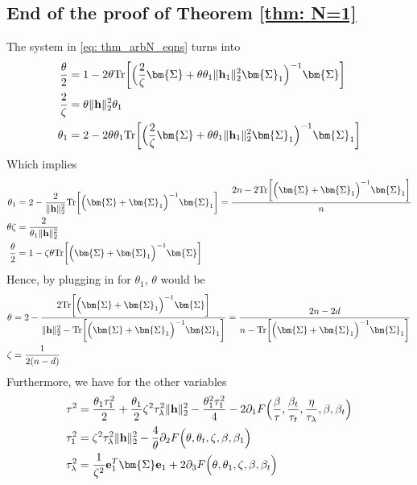 \documentclass[final]{l4dc2026}
\newcommand{\bSigma}{\bm{\Sigma}}
\newcommand{\be}{\mathbf{e}}
\newcommand{\bh}{\mathbf{h}}
\newcommand{\tr}{\text{Tr}}
\begin{document}
\subsection{End of the proof of Theorem \ref{thm: N=1}}
The system in \eqref{eq: thm_arbN_eqns} turns into
\begin{align*}
    \frac{\theta}{2}  &= 1 -  2\theta \tr \biggl[\Bigl(\frac{2}{\zeta}\bSigma+\theta \theta_1 \|\bh_1\|_2^2 \bSigma_1 \Bigr)^{-1} \bSigma \biggr] \\
    \frac{2}{\zeta} &= \theta \|\bh\|_2^2  \theta_1 \\
    \theta_1 &= 2 - 2 \theta \theta_1 \tr \biggl[\Bigl(\frac{2}{\zeta}\bSigma+\theta\theta_1 \|\bh_1\|_2^2 \bSigma_1 \Bigr)^{-1} \bSigma_1\biggr]
\end{align*}
Which implies
\begin{align*}
    \theta_1 &= 2 - \frac{2}{\|\bh\|_2^2} \tr \biggl[ \Bigl( \bSigma + \bSigma_1\Bigr)^{-1} \bSigma_1\biggr] = \frac{2n - 2\tr \biggl[\Bigl( \bSigma + \bSigma_1\Bigr)^{-1} \bSigma_1 \biggr] }{n} \\
    \theta \zeta &= \frac{2}{\theta_1 \|\bh\|_2^2} \\
    \frac{\theta}{2}  &= 1 -  \zeta \theta \tr \biggl[\Bigl( \bSigma + \bSigma_1\Bigr)^{-1} \bSigma\biggr]
\end{align*}
Hence, by plugging in for $\theta_1$, $\theta$ would be
\begin{align*}
    \theta &= 2 - \frac{2\tr \biggl[ \Bigl( \bSigma + \bSigma_1\Bigr)^{-1} \bSigma \biggr]}{\|\bh\|_2^2- \tr \biggl[ \Bigl( \bSigma + \bSigma_1\Bigr)^{-1} \bSigma_1 \biggr]}  = \frac{2n - 2d}{n - \tr \biggl[\Bigl( \bSigma + \bSigma_1\Bigr)^{-1} \bSigma_1 \biggr]} \\
    \zeta &= \frac{1}{2(n-d)}
\end{align*}
Furthermore, we have for the other variables
\begin{align*}
    \tau^2 &= \frac{\theta_1 \tau^2_1}{2} + \frac{\theta_1}{2} \zeta^2 \tau_{\lambda}^2 \|\bh\|_2^2 - \frac{\theta_1^2 \tau_1^2}{4} - 2 \partial_1  F\Bigl(\frac{\beta}{\tau}, \frac{\beta_t}{\tau_t}, \frac{\eta}{\tau_{\lambda}}, \beta, \beta_t\Bigr) \\
    \tau_1^2 &= \zeta^2 \tau_{\lambda}^2 \|\bh\|_2^2 - \frac{4}{\theta} \partial_2 F\Bigl(\theta, \theta_t, \zeta, \beta, \beta_1\Bigr) \\
    \tau^2_{\lambda} &=  \frac{1}{\zeta^2} \be_1^T \bSigma \be_1 + 2\partial_3 F\Bigl(\theta, \theta_1, \zeta, \beta, \beta_t\Bigr) 
\end{align*}
\end{document}
